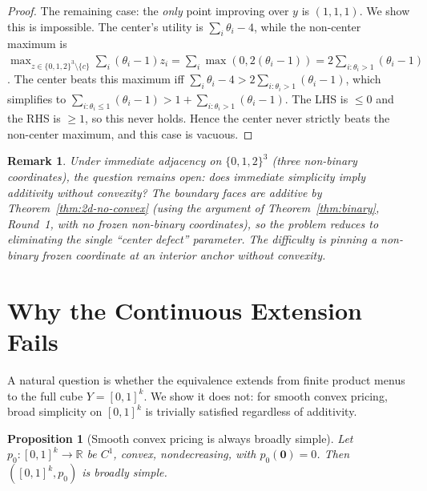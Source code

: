 \documentclass[11pt]{article}
\newtheorem{proposition}[theorem]{Proposition}
\newtheorem{remark}[theorem]{Remark}
\newcommand{\R}{\mathbb{R}}
\begin{document}
\begin{proof}
The remaining case: the \emph{only} point improving over $y$ is
$(1,1,1)$.  We show this is impossible.  The center's utility is
$\sum_i \theta_i - 4$, while the non-center maximum is
$\max_{z \in \{0,1,2\}^3 \setminus \{c\}} \sum_i (\theta_i - 1) z_i
= \sum_i \max(0, 2(\theta_i - 1))
= 2 \sum_{i: \theta_i > 1} (\theta_i - 1)$.
The center beats this maximum iff
$\sum_i \theta_i - 4 > 2\sum_{i: \theta_i > 1} (\theta_i - 1)$,
which simplifies to
$\sum_{i: \theta_i \leq 1} (\theta_i - 1) > 1 + \sum_{i: \theta_i > 1} (\theta_i - 1)$.
The LHS is $\leq 0$ and the RHS is $\geq 1$, so this never holds.
Hence the center never strictly beats the non-center maximum, and
this case is vacuous.
\end{proof}

\begin{remark}\label{rem:sharp-3d}
Under \emph{immediate} adjacency on $\{0,1,2\}^3$ (three non-binary
coordinates), the question remains open: does immediate simplicity
imply additivity without convexity?  The boundary faces are additive
by Theorem~\ref{thm:2d-no-convex} (using the argument of
Theorem~\ref{thm:binary}, Round~1, with no frozen non-binary
coordinates), so the problem reduces to eliminating the single
``center defect'' parameter.  The difficulty is pinning a non-binary
frozen coordinate at an interior anchor without convexity.
\end{remark}

\section{Why the Continuous Extension Fails}\label{sec:continuous}

A natural question is whether the equivalence extends from finite
product menus to the full cube $Y = [0,1]^k$.  We show it does not:
for smooth convex pricing, broad simplicity on $[0,1]^k$ is
trivially satisfied regardless of additivity.

\begin{proposition}[Smooth convex pricing is always broadly simple]%
\label{prop:smooth-trivial}
Let $p_0\colon [0,1]^k \to \R$ be $C^1$, convex, nondecreasing,
with $p_0(\mathbf{0}) = 0$.
Then $([0,1]^k, p_0)$ is broadly simple.
\end{proposition}
\end{document}
